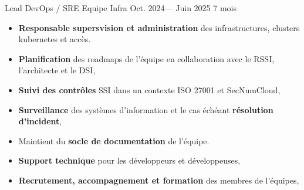 \jobposition%
{Lead DevOps / SRE}%
{Equipe Infra}%
{Oct. 2024--- Juin 2025}%
{7 mois}%
{
	\begin{itemize}
		\item \textbf{Responsable supersvision et administration} des
		      infrastructures, clusters kubernetes et accès.
		\item \textbf{Planification} des roadmaps de l'équipe en collaboration avec
		      le RSSI, l'architecte et le DSI,
		\item \textbf{Suivi des contrôles} SSI dans un contexte ISO 27001 et SecNumCloud,
		\item \textbf{Surveillance} des systèmes d'information et le cas échéant
		      \textbf{résolution d'incident},
		\item Maintient du \textbf{socle de documentation} de l'équipe.
		\item \textbf{Support technique} pour les développeurs et développeuses,
		\item \textbf{Recrutement, accompagnement et formation} des membres de
		      l'équipes,
	\end{itemize}
}

